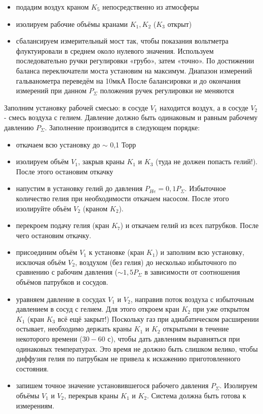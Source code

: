 \documentclass[a4paper, 12pt]{article} %
\begin{document}
\begin{itemize}
\item подадим воздух краном $K_5$ непосредственно из атмосферы
\item изолируем рабочие объёмы кранами $K_1, K_2$ ($K_3$ открыт)
\item сбалансируем измерительный мост так, чтобы показания вольтметра флуктуировали в среднем около нулевого значения. Используем последовательно ручки регулировки «грубо», затем «точно». По достижении баланса переключатели моста установим на максимум. Диапазон измерений гальванометра переведём на 10мкА После балансировки и до окончания измерений при данном $P_\Sigma$ положения ручек регулировки не меняются
\end{itemize}

Заполним установку рабочей смесью: в сосуде $V_1$ находится воздух, а в сосуде $V_2$ - смесь воздуха с гелием. Давление должно быть одинаковым и равным рабочему давлению $P_\Sigma$. Заполнение производится в следующем порядке:

\begin{itemize}
\item откачаем всю установку до $\sim$ 0,1 Торр
\item изолируем объём $V_1$, закрыв краны $K_1$ и $K_3$ (туда не должен попасть гелий!). После этого остановим откачку
\item напустим в установку гелий до давления $P_{He} = 0,1 P_{\Sigma}$. Избыточное количество гелия при необходимости откачаем насосом. После этого изолируйте объём $V_2$ (краном $K_2$).
\item перекроем подачу гелия (кран $K_7$) и откачаем гелий из всех патрубков. После чего остановим откачку.
\item присоединим объём $V_1$ к установке (кран $K_1$) и заполним всю установку, исключая объём $V_2$, воздухом (без гелия) до несколько избыточного по сравнению с рабочим давления ($\sim 1,5 P_{\Sigma} $ в зависимости от соотношения объёмов патрубков и сосудов.
\item уравняем давление в сосудах $V_1$ и $V_2$, направив поток воздуха с избыточным давлением в сосуд с гелием. Для этого откроем кран $K_2$
при уже открытом $K_1$ (кран $K_3$ всё ещё закрыт!) Поскольку газ при адиабатическом расширении остывает, необходимо держать краны $K_1$ и $K_2$ открытыми в течение некоторого времени ($30-60$ с), чтобы дать давлениям выравняться при одинаковых температурах. Это время не должно быть слишком велико, чтобы диффузия гелия по патрубкам не привела к искажению приготовленного состояния.
\item запишем точное значение установившегося рабочего давления $P_\Sigma$. Изолируем объёмы $V_1$ и $V_2$, перекрыв краны $K_1$ и $K_2$. Система должна быть готова к измерениям.
\end{itemize}
\end{document}
